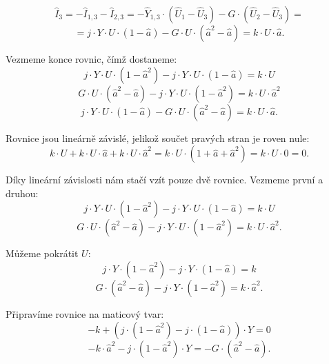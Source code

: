 \documentclass{article}
\begin{document}
$$
    \hat{I}_3 = - \hat{I}_{1,3} - \hat{I}_{2,3} = - \hat{Y}_{1,3} \cdot \left( \hat{U}_1 - \hat{U}_3 \right) - G \cdot \left( \hat{U}_2 - \hat{U}_3 \right) =
$$
$$
    = j \cdot Y \cdot U \cdot \left( 1 - \hat{a} \right) - G \cdot U \cdot \left( \hat{a}^2 - \hat{a} \right) = k \cdot U \cdot \hat{a}.
$$

Vezmeme konce rovnic, čímž dostaneme:
$$
    j \cdot Y \cdot U \cdot \left( 1 - \hat{a}^2 \right) - j \cdot Y \cdot U \cdot \left( 1 - \hat{a} \right) = k \cdot U
$$
$$
    G \cdot U \cdot \left( \hat{a}^2 - \hat{a} \right) - j \cdot Y \cdot U \cdot \left( 1 - \hat{a}^2 \right) = k \cdot U \cdot \hat{a}^2
$$
$$
    j \cdot Y \cdot U \cdot \left( 1 - \hat{a} \right) - G \cdot U \cdot \left( \hat{a}^2 - \hat{a} \right) = k \cdot U \cdot \hat{a}.
$$

Rovnice jsou lineárně závislé, jelikož součet pravých stran je roven nule:
$$
    k \cdot U + k \cdot U \cdot \hat{a} + k \cdot U \cdot \hat{a}^2 = k \cdot U \cdot \left( 1 + \hat{a} + \hat{a}^2 \right) = k \cdot U \cdot 0 = 0.
$$

Díky lineární závislosti nám stačí vzít pouze dvě rovnice. Vezmeme první a druhou:
$$
    j \cdot Y \cdot U \cdot (1 - \hat{a}^2) - j \cdot Y \cdot U \cdot (1 - \hat{a}) = k \cdot U
$$
$$
    G \cdot U \cdot (\hat{a}^2 - \hat{a}) - j \cdot Y \cdot U \cdot (1 - \hat{a}^2) = k \cdot U \cdot \hat{a}^2.
$$

Můžeme pokrátit $U$:
$$
    j \cdot Y \cdot (1 - \hat{a}^2) - j \cdot Y \cdot (1 - \hat{a}) = k
$$
$$
    G \cdot (\hat{a}^2 - \hat{a}) - j \cdot Y \cdot (1 - \hat{a}^2) = k \cdot \hat{a}^2.
$$

Připravíme rovnice na maticový tvar:
$$
    -k + \left( j \cdot (1 - \hat{a}^2) - j \cdot (1 - \hat{a}) \right) \cdot Y = 0
$$
$$
    -k \cdot \hat{a}^2 - j \cdot (1 - \hat{a}^2) \cdot Y = -G \cdot (\hat{a}^2 - \hat{a}).
$$
\end{document}
